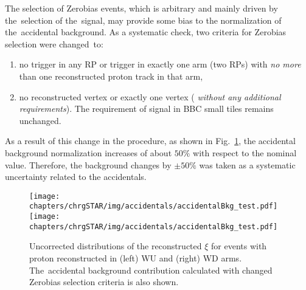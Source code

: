 The selection of Zerobias events, which is arbitrary and mainly driven by the~selection of the~signal, may provide some bias to the normalization of the~accidental background. As a systematic check, two criteria for  Zerobias selection were changed~to:
 \begin{enumerate}
 	\item no trigger in any RP or trigger in exactly one arm (two RPs) with \textit{no more} than one reconstructed proton track in that arm,
 	\item no reconstructed vertex or exactly one vertex (%
 	\textit{without any additional requirements}). The requirement of signal in BBC small tiles remains unchanged. 
 \end{enumerate}
 As a result of this change in the procedure, as shown in Fig.~\ref{fig:STARaccidentalsXiSyst}, the accidental background normalization increases of about $50\%$ with respect to the nominal value. Therefore, the background changes by $\pm50\%$ was taken as a systematic uncertainty related to the accidentals.
 
 \begin{figure}[h!]
 	\centering
 	\texttt{[image: chapters/chrgSTAR/img/accidentals/accidentalBkg\_test.pdf]}
 	\texttt{[image: chapters/chrgSTAR/img/accidentals/accidentalBkg\_test.pdf]}
 	\caption{Uncorrected distributions of the reconstructed $\xi$ for events with proton reconstructed in (left) WU and (right) WD arms. The~accidental background contribution calculated with changed Zerobias selection criteria is also shown.}
 	\label{fig:STARaccidentalsXiSyst}
 \end{figure}




